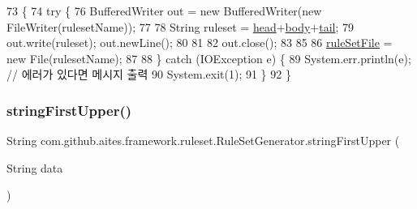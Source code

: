 \begin{DoxyCode}
73                                                               \{
74         \textcolor{keywordflow}{try} \{
76               BufferedWriter out = \textcolor{keyword}{new} BufferedWriter(\textcolor{keyword}{new} FileWriter(rulesetName));
77         
78               String ruleset = \mbox{\hyperlink{classcom_1_1github_1_1aites_1_1framework_1_1ruleset_1_1_rule_set_generator_a571e3c391cc48fdfdd9cc286988317fe}{head}}+\mbox{\hyperlink{classcom_1_1github_1_1aites_1_1framework_1_1ruleset_1_1_rule_set_generator_a1fbfa36b17c118b50f731278af7d8ae5}{body}}+\mbox{\hyperlink{classcom_1_1github_1_1aites_1_1framework_1_1ruleset_1_1_rule_set_generator_a2bd41e50cccfad575989d06ea487100e}{tail}};
79               out.write(ruleset); out.newLine();
80            
81               
82               out.close();
83              
85               
86               \mbox{\hyperlink{classcom_1_1github_1_1aites_1_1framework_1_1ruleset_1_1_rule_set_generator_a4a4bf29943c7c05a7e1a7d60040305ff}{ruleSetFile}} = \textcolor{keyword}{new} File(rulesetName);
87              
88             \} \textcolor{keywordflow}{catch} (IOException e) \{
89                 System.err.println(e); \textcolor{comment}{// 에러가 있다면 메시지 출력}
90                 System.exit(1);
91             \}
92     \}
\end{DoxyCode}
\mbox{\label{classcom_1_1github_1_1aites_1_1framework_1_1ruleset_1_1_rule_set_generator_a03d399d47d0d6aa6ffbb7c3ce7523fee}} 
\subsubsection{\texorpdfstring{string\+First\+Upper()}{stringFirstUpper()}}
{\footnotesize\ttfamily String com.\+github.\+aites.\+framework.\+ruleset.\+Rule\+Set\+Generator.\+string\+First\+Upper (\begin{DoxyParamCaption}\item[{String}]{data }\end{DoxyParamCaption})\hspace{0.3cm}{\ttfamily [private]}}



